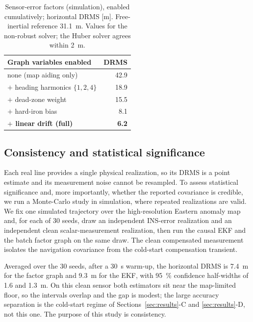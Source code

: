 \documentclass{IEEEtaes}
\begin{document}
\begin{table}[t]
\caption{Sensor-error factors (simulation), enabled cumulatively; horizontal DRMS
[m]. Free-inertial reference \SI{31.1}{\meter}. Values for the non-robust solver;
the Huber solver agrees within \SI{2}{\meter}.}
\label{tab:sensor}
\centering
\begin{tabular}{lr}
\toprule
Graph variables enabled & DRMS \\
\midrule
none (map aiding only) & 42.9 \\
$+$ heading harmonics $\{1,2,4\}$ & 18.9 \\
$+$ dead-zone weight & 15.5 \\
$+$ hard-iron bias & 8.1 \\
\textbf{$+$ linear drift (full)} & \textbf{6.2} \\
\bottomrule
\end{tabular}
\end{table}

\subsection{Consistency and statistical significance}
Each real line provides a single physical realization, so its DRMS is a point
estimate and its measurement noise cannot be resampled. To assess statistical
significance and, more importantly, whether the reported covariance is credible, we
run a Monte-Carlo study in simulation, where repeated realizations are valid. We fix
one simulated trajectory over the high-resolution Eastern anomaly map and, for each
of \num{30} seeds, draw an independent INS-error realization and an independent clean
scalar-measurement realization, then run the causal EKF and the batch factor graph
on the same draw. The clean compensated measurement isolates the navigation
covariance from the cold-start compensation transient.

Averaged over the \num{30} seeds, after a \SI{30}{\second} warm-up, the horizontal
DRMS is \SI{7.4}{\meter} for the factor graph and \SI{9.3}{\meter} for the EKF, with
\SI{95}{\percent} confidence half-widths of \SI{1.6}{} and \SI{1.3}{\meter}. On this
clean sensor both estimators sit near the map-limited floor, so the intervals
overlap and the gap is modest; the large accuracy separation is the cold-start
regime of Sections~\ref{sec:results}-C and \ref{sec:results}-D, not this one. The
purpose of this study is consistency.
\end{document}
